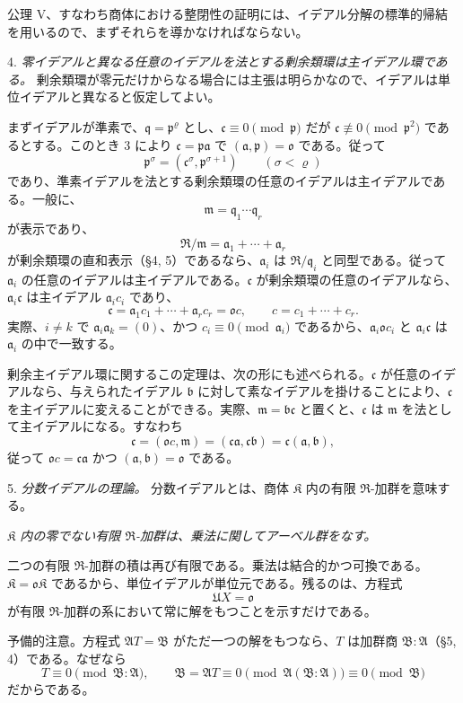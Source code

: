 \documentclass[11pt]{article}
\providecommand{\mR}{\mathfrak{R}}
\providecommand{\mK}{\mathfrak{K}}
\providecommand{\ma}{\mathfrak{a}}
\providecommand{\mb}{\mathfrak{b}}
\providecommand{\mc}{\mathfrak{c}}
\providecommand{\mm}{\mathfrak{m}}
\providecommand{\mo}{\mathfrak{o}}
\providecommand{\mpideal}{\mathfrak{p}}
\providecommand{\mq}{\mathfrak{q}}
\begin{document}
公理 V、すなわち商体における整閉性の証明には、イデアル分解の標準的帰結を用いるので、まずそれらを導かなければならない。

4. \emph{零イデアルと異なる任意のイデアルを法とする剰余類環は主イデアル環である。} 剰余類環が零元だけからなる場合には主張は明らかなので、イデアルは単位イデアルと異なると仮定してよい。

まずイデアルが準素で、$\mq=\mpideal^\varrho$ とし、$\mc\equiv0\pmod{\mpideal}$ だが $\mc\not\equiv0\pmod{\mpideal^2}$ であるとする。このとき 3 により $\mc=\mpideal\ma$ で $(\ma,\mpideal)=\mo$ である。従って
\[
        \mpideal^\sigma=(\mc^\sigma,\mpideal^{\sigma+1})
        \qquad(\sigma<\varrho)
\]
であり、準素イデアルを法とする剰余類環の任意のイデアルは主イデアルである。一般に、
\[
        \mm=\mq_1\cdots\mq_r
\]
が表示であり、
\[
        \mR/\mm=\ma_1+\cdots+\ma_r
\]
が剰余類環の直和表示（§4, 5）であるなら、$\ma_i$ は $\mR/\mq_i$ と同型である。従って $\ma_i$ の任意のイデアルは主イデアルである。$\mc$ が剰余類環の任意のイデアルなら、$\ma_i\mc$ は主イデアル $\ma_i c_i$ であり、
\[
        \mc=\ma_1c_1+\cdots+\ma_r c_r=\mo c,
        \qquad c=c_1+\cdots+c_r.
\]
実際、$i\ne k$ で $\ma_i\ma_k=(0)$、かつ $c_i\equiv0\pmod{\ma_i}$ であるから、$\ma_i\mo c_i$ と $\ma_i\mc$ は $\ma_i$ の中で一致する。

剰余主イデアル環に関するこの定理は、次の形にも述べられる。$\mc$ が任意のイデアルなら、与えられたイデアル $\mb$ に対して素なイデアルを掛けることにより、$\mc$ を主イデアルに変えることができる。実際、$\mm=\mb\mc$ と置くと、$\mc$ は $\mm$ を法として主イデアルになる。すなわち
\[
        \mc=(\mo c,\mm)=(\mc\ma,\mc\mb)=\mc(\ma,\mb),
\]
従って $\mo c=\mc\ma$ かつ $(\ma,\mb)=\mo$ である。

5. \emph{分数イデアルの理論。} 分数イデアルとは、商体 $\mK$ 内の有限 $\mR$-加群を意味する。

\emph{$\mK$ 内の零でない有限 $\mR$-加群は、乗法に関してアーベル群をなす。}

二つの有限 $\mR$-加群の積は再び有限である。乗法は結合的かつ可換である。$\mK=\mo\mK$ であるから、単位イデアルが単位元である。残るのは、方程式
\[
        \mathfrak U X=\mo
\]
が有限 $\mR$-加群の系において常に解をもつことを示すだけである。

予備的注意。方程式 $\mathfrak A T=\mathfrak B$ がただ一つの解をもつなら、$T$ は加群商 $\mathfrak B:\mathfrak A$（§5, 4）である。なぜなら
\[
        T\equiv0\pmod{\mathfrak B:\mathfrak A},
        \qquad
        \mathfrak B=\mathfrak A T\equiv0\pmod{\mathfrak A(\mathfrak B:\mathfrak A)}\equiv0\pmod{\mathfrak B}
\]
だからである。
\end{document}
